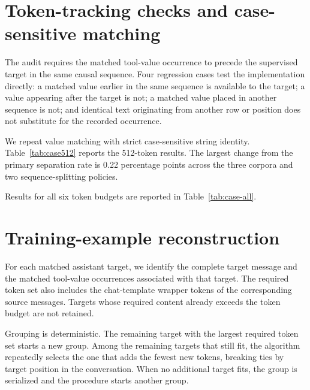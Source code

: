 \documentclass[pdflatex,sn-basic,Numbered]{sn-jnl}
\begin{document}
\begin{appendices}
\section{Token-tracking checks and case-sensitive matching}

The audit requires the matched tool-value occurrence to precede the supervised target in the same
causal sequence. Four regression cases test the implementation directly: a matched value earlier
in the same sequence is available to the target; a value appearing after the target is not; a
matched value placed in another sequence is not; and identical text originating from another row
or position does not substitute for the recorded occurrence.

We repeat value matching with strict case-sensitive string identity. Table~\ref{tab:case512}
reports the 512-token results. The largest change from the primary separation rate is
0.22 percentage points across the three corpora and two sequence-splitting policies.

\begin{table}[ht]
\centering
\caption{
Case-sensitive matching at a 512-token budget. $\Delta$ is the case-sensitive separation rate
minus the primary case-insensitive rate, in percentage points.
}
\label{tab:case512}
\resizebox{\textwidth}{!}{}
\end{table}

Results for all six token budgets are reported in Table~\ref{tab:case-all}.

\begingroup
\fontsize{6}{7.2}\selectfont
\setlength{\tabcolsep}{1.5pt}

\endgroup


\section{Training-example reconstruction}

For each matched assistant target, we identify the complete target message and the matched
tool-value occurrences associated with that target. The required token set also includes the
chat-template wrapper tokens of the corresponding source messages. Targets whose required content
already exceeds the token budget are not retained.

Grouping is deterministic. The remaining target with the largest required token set starts a new
group. Among the remaining targets that still fit, the algorithm repeatedly selects the one that
adds the fewest new tokens, breaking ties by target position in the conversation. When no
additional target fits, the group is serialized and the procedure starts another group.


\end{appendices}
\end{document}
